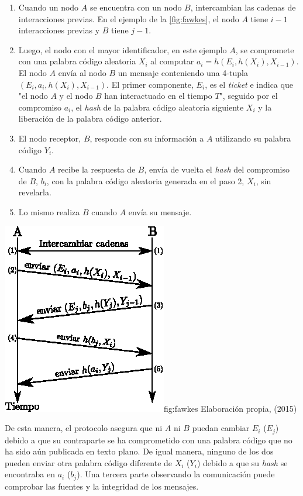 \begin{enumerate}
  \item Cuando un nodo $A$ se encuentra con un nodo $B$, intercambian las
  cadenas de interacciones previas. En el ejemplo de la \ref{fig:fawkes}, el
  nodo $A$ tiene $i - 1$ interacciones previas y $B$ tiene $j - 1$.
  \item Luego, el nodo con el mayor identificador, en este ejemplo $A$, se
  compromete con una palabra código aleatoria $X_i$ al computar $a_i = h(E_i,
  h(X_i), X_{i-1})$. El nodo $A$ envía al nodo $B$ un mensaje conteniendo una
  4-tupla $(E_i, a_i, h(X_i), X_{i - 1})$. El primer componente, $E_i$, es el
  \textit{ticket} e indica que "el nodo $A$ y el nodo $B$ han interactuado en el
  tiempo $T$", seguido por el compromiso $a_i$, el \textit{hash} de la palabra
  código aleatoria siguiente $X_i$ y la liberación de la palabra código
  anterior.
  \item El nodo receptor, $B$, responde con su información a $A$ utilizando su
  palabra código $Y_i$.
  \item Cuando $A$ recibe la respuesta de $B$, envía de vuelta el \textit{hash}
  del compromiso de $B$, $b_i$, con la palabra código aleatoria generada en el
  paso 2, $X_i$, sin revelarla.
  \item Lo mismo realiza $B$ cuando $A$ envía su mensaje.
\end{enumerate}


{\includegraphics[scale=1.8]{imagenes/seguridad/exchange.eps}}{fig:fawkes}
{Elaboración propia, (2015)}


De esta manera, el protocolo asegura que ni $A$ ni $B$ puedan cambiar $E_i$
($E_j$) debido a que su contraparte se ha comprometido con una palabra código
que no ha sido aún publicada en texto plano. De igual manera, ninguno de los dos
pueden enviar otra palabra código diferente de $X_i$ ($Y_i$) debido a que su
\textit{hash} se encontraba en $a_i$ ($b_j$). Una tercera parte observando la
comunicación puede comprobar las fuentes y la integridad de los mensajes.

